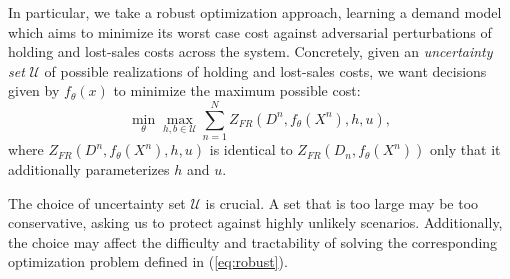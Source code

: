 \documentclass[poms,final,blindrev]{poms1_V1} %
\begin{document}
In particular, we take a robust optimization approach, learning a demand model which aims to minimize its worst case cost against adversarial perturbations of holding and lost-sales costs across the system. Concretely, given an \emph{uncertainty set} $\mathcal{U}$ of possible realizations of holding and lost-sales costs, we want decisions given by $f_\theta(x)$ to minimize the maximum possible cost:
\begin{equation}
\label{eq:robust}
    \min_{\theta} \max_{h,b \in \mathcal{U}} \sum_{n=1}^N Z_{FR}(D^n, f_\theta(X^n), h, u),
\end{equation}
where $Z_{FR}(D^n, f_\theta(X^n), h, u)$ is identical to $Z_{FR}(D_n, f_\theta(X^n))$ only that it additionally parameterizes $h$ and $u$. 

The choice of uncertainty set $\mathcal{U}$ is crucial. A set that is too large may be too conservative, asking us to protect against highly unlikely scenarios. Additionally, the choice may affect the difficulty and tractability of solving the corresponding optimization problem defined in (\ref{eq:robust}). 
\end{document}
